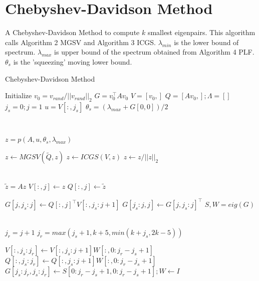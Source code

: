 \documentclass[a4paper]{article}
\begin{document}
\pagebreak

\section{Chebyshev-Davidson Method}
A Chebyshev-Davidson Method to compute $k$ smallest eigenpairs. This algorithm calls Algorithm 2 MGSV and Algorithm 3 ICGS. $\lambda_{min}$ is the lower bound of spectrum. $\lambda_{max}$ is upper bound of the spectrum obtained from Algorithm 4 PLF. $\theta_s$ is the 'squeezing' moving lower bound.




\begin{algorithm}
\caption{Chebyshev-Davidson Method}\label{alg:CDM}
\begin{algorithmic}[1]




\State Initialize $v_0 = v_{rand} / ||v_{rand}||_2$ 
\State $G = v_0^\top A v_0$ 
\State $V = [v_0,]$ 
\State $Q = [Av_0,]; \Lambda = [] $
\State $j_s = 0 ;j = 1$ 
\State $u = V[:,j_s]$
\State $\theta_s = (\lambda_{max} + G[0,0])/2$




\\



    \State $z = p(A, u, \theta_s, \lambda_{max}) $ 

    \State $z \gets MGSV(\tilde{Q}, z)$ 
    \State $z \gets ICGS(V, z)$ 
    \State $z \gets z / ||z||_2$




    \\
    \State $\tilde{z} = Az$
    \State $V[:,j] \gets z$
    \State $Q[:,j] \gets \tilde{z}$

    \State $G[j, j_s:j] \gets Q[:,j]^\top V[:,j_s:j+1]$
    \State $G[j_s:j, j] \gets G[j, j_s:j]^\top $
    \State $ S,W = eig(G)$

    \\
    \State $j_r = j + 1$
        \State $j_r = max(j_s+1, k+5, min(k + j_s, 2k -5))$
    \EndIf
    
    \State $V[:,j_s:j_r] \gets V[:,j_s:j+1]W[:, 0:j_r - j_s + 1] $
    \State $Q[:,j_s:j_r] \gets Q[:,j_s:j+1]W[:, 0:j_r - j_s + 1] $
    \State $G[j_s:j_r,j_s:j_r] \gets S[0:j_r - j_s + 1,0:j_r - j_s + 1]; W \gets I $


\end{algorithmic}
\end{algorithm}
\end{document}
